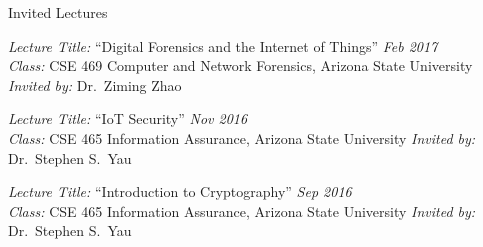 
\begin{rBulletSubsection}{Invited Lectures}

  \item \emph{Lecture Title:} ``Digital Forensics and the Internet of Things'' \hfill \emph{Feb 2017} \\
    \emph{Class:} CSE 469 Computer and Network Forensics, Arizona State University \hfill \emph{Invited by:} Dr.\ Ziming Zhao

  \item \emph{Lecture Title:} ``IoT Security'' \hfill \emph{Nov 2016} \\
    \emph{Class:} CSE 465 Information Assurance, Arizona State University \hfill \emph{Invited by:} Dr.\ Stephen S.\ Yau

  \item \emph{Lecture Title:} ``Introduction to Cryptography'' \hfill \emph{Sep 2016} \\
    \emph{Class:} CSE 465 Information Assurance, Arizona State University \hfill \emph{Invited by:} Dr.\ Stephen S.\ Yau




\end{rBulletSubsection}
